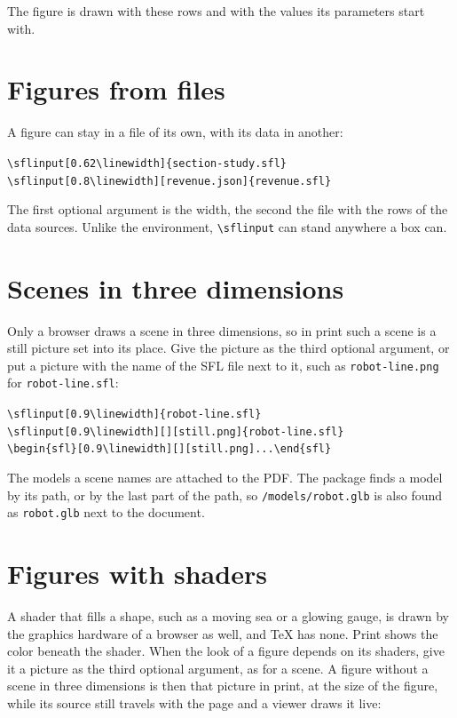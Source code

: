 \documentclass{article}
\newenvironment{code}{\par\smallskip\begin{alltt}\small}{\end{alltt}\smallskip}
\begin{document}
The figure is drawn with these rows and with the values its parameters start with.

\section{Figures from files}

A figure can stay in a file of its own, with its data in another:

\begin{code}
\textbackslash{}sflinput[0.62\textbackslash{}linewidth]\{section-study.sfl\}
\textbackslash{}sflinput[0.8\textbackslash{}linewidth][revenue.json]\{revenue.sfl\}
\end{code}

The first optional argument is the width, the second the file with the rows of the data sources. Unlike the environment,
\texttt{\textbackslash{}sflinput} can stand anywhere a box can.

\section{Scenes in three dimensions}

Only a browser draws a scene in three dimensions, so in print such a scene is a still picture set into its place. Give the picture as the
third optional argument, or put a picture with the name of the SFL file next to it, such as \texttt{robot-line.png} for
\texttt{robot-line.sfl}:

\begin{code}
\textbackslash{}sflinput[0.9\textbackslash{}linewidth]\{robot-line.sfl\}
\textbackslash{}sflinput[0.9\textbackslash{}linewidth][][still.png]\{robot-line.sfl\}
\textbackslash{}begin\{sfl\}[0.9\textbackslash{}linewidth][][still.png] ... \textbackslash{}end\{sfl\}
\end{code}

The models a scene names are attached to the PDF. The package finds a model by its path, or by the last part of the path, so
\texttt{/models/robot.glb} is also found as \texttt{robot.glb} next to the document.

\section{Figures with shaders}

A shader that fills a shape, such as a moving sea or a glowing gauge, is drawn by the graphics hardware of a browser as well, and TeX has
none. Print shows the color beneath the shader. When the look of a figure depends on its shaders, give it a picture as the third optional
argument, as for a scene. A figure without a scene in three dimensions is then that picture in print, at the size of the figure, while its
source still travels with the page and a viewer draws it live:
\end{document}

